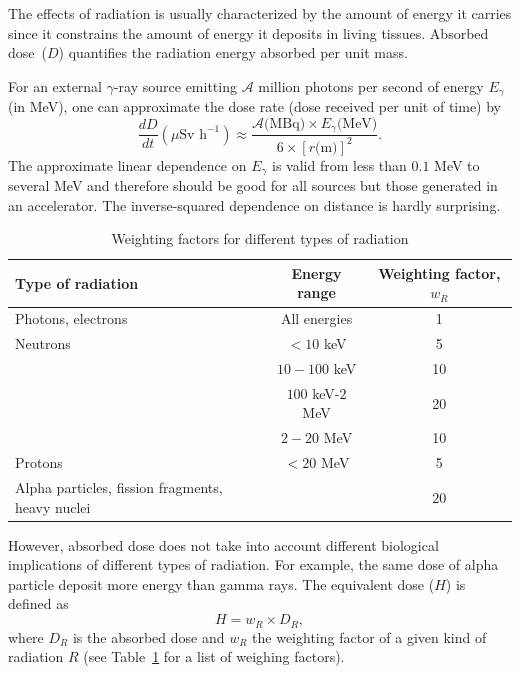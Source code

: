 \documentclass[nofootinbib,preprint,aps]{revtex4-1}
\begin{document}
        The effects of radiation is usually characterized by the amount of energy it carries since it constrains
        the amount of energy it deposits in living tissues.
        Absorbed dose~($D$) quantifies the 
        radiation energy absorbed per unit mass.

        For an external $\gamma$-ray source emitting $\mathcal{A}$ million photons per second 
        of energy $E_{\gamma}$
        (in MeV), one can approximate the dose rate (dose received per unit of time) by \cite[chapt. 7]{l01}
        \begin{equation}
            \frac{dD}{dt}(\mu\text{Sv h}^{-1}) \approx \frac{\mathcal{A}\text{(MBq)}\times E_{\gamma}\text{(MeV)}}
            {6\times [r\text{(m)}]^2}.
        \end{equation}
        The approximate linear dependence on $E_{\gamma}$ is valid from less than $0.1$ MeV to several
        MeV and therefore should be good for all sources but those generated in an accelerator.\cite{my68}
        The inverse-squared dependence on distance is hardly surprising.

        \begin{table}[h]
            \centering
            \caption{Weighting factors for different types of radiation \cite{icrp74}}
            \begin{ruledtabular}
                \begin{tabular}{l c c}
                Type of radiation & Energy range & Weighting factor, $w_R$\\
                \hline
                Photons, electrons & All energies & 1\\
                Neutrons & $<10$ keV & 5 \\
                         & $10-100$ keV & 10 \\
                         & $100$ keV-$2$ MeV & 20 \\
                         & $2-20$ MeV & 10 \\
                Protons & $<20$ MeV & 5 \\
                Alpha particles, fission fragments, heavy nuclei & & $20$\\
            \end{tabular}
            \label{tab:eq}
            \end{ruledtabular}
        \end{table}
        However, absorbed dose does not take into account different biological implications of different types
        of radiation.
        For example, the same dose of alpha particle deposit more energy than gamma rays. The equivalent
        dose ($H$) is defined as
        \begin{equation}
        H=w_R \times D_R,
        \end{equation}
        where $D_R$ is the absorbed dose and $w_R$ the weighting factor of a given kind of radiation $R$
        (see Table~\ref{tab:eq} for a list of weighing factors).
\end{document}
